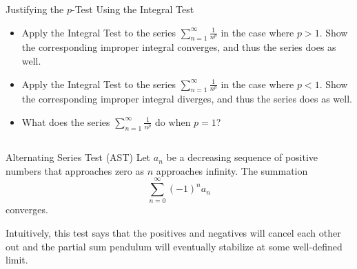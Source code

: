 \begin{exercise}{Justifying the $p$-Test Using the Integral Test \Coffeecup }
\begin{itemize}
\item Apply the Integral Test to the series $\sum_{n=1}^\infty \frac{1}{n^p}$ in the case where $p>1$.  Show the corresponding improper integral converges, and thus the series does as well.
\vspace*{1in}
\item Apply the Integral Test to the series $\sum_{n=1}^\infty \frac{1}{n^p}$ in the case where $p<1$.  Show the corresponding improper integral diverges, and thus the series does as well.
\vspace*{1in}
\item What does the series $\sum_{n=1}^\infty \frac{1}{n^p}$ do when $p=1$? 
\vspace*{1in}
\end{itemize}
\end{exercise}

\subsection{}

\begin{theorem}{Alternating Series Test (AST)}
Let $a_n$ be a decreasing sequence of positive numbers that approaches zero as $n$ approaches infinity.  The summation $$\sum_{n=0}^\infty \left(-1\right)^n a_n $$ converges. 
\end{theorem}
Intuitively, this test says that the positives and negatives will cancel each other out and the partial sum pendulum will eventually stabilize at some well-defined limit. 

